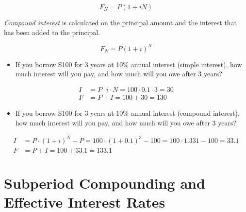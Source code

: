 \begin{theorem}
    \begin{equation}
        F_N = P(1 + iN)
    \end{equation}
\end{theorem}

\begin{definition}
    \textit{Compound interest} is calculated on the principal amount and the interest that has been added to the principal.
\end{definition}

\begin{theorem}
    \begin{equation}
        F_N = P(1 + i)^N
    \end{equation}
\end{theorem}
\begin{example}
    \begin{itemize}
        \item If you borrow S100 for 3 years at 10\% annual interest (simple interest), how much interest will you pay, and how much will you owe after 3 years?
    \end{itemize}
    \begin{align*}
        I & = P \cdot i \cdot N = 100 \cdot 0.1 \cdot 3 = 30 \\
        F & = P + I = 100 + 30 = 130
    \end{align*}
\end{example}

\begin{example}
    \begin{itemize}
        \item If you borrow S100 for 3 years at 10\% annual interest (compound interest), how much interest will you pay, and how much will you owe after 3 years?
    \end{itemize}
    \begin{align*}
        I & = P \cdot (1 + i)^N - P = 100 \cdot (1 + 0.1)^3 - 100 = 100 \cdot 1.331 - 100 = 33.1 \\
        F & = P + I = 100 + 33.1 = 133.1
    \end{align*}
\end{example}

\section{Subperiod Compounding and Effective Interest Rates}

